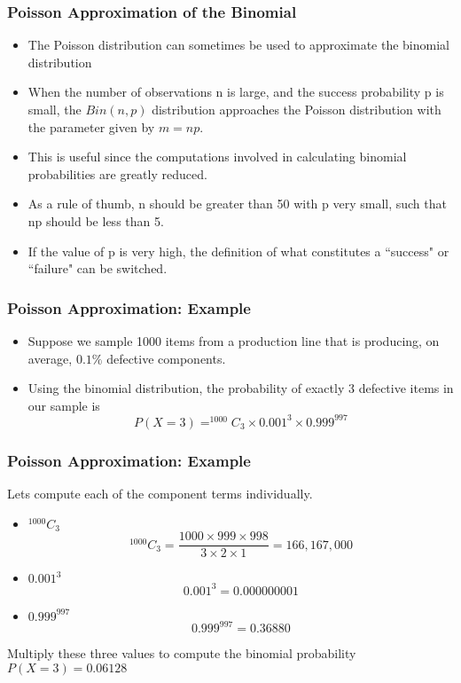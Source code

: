 

\begin{frame}
	\frametitle{Poisson Approximation of the Binomial}
	
	\begin{itemize}
		\item The Poisson distribution can sometimes be used to approximate the
		binomial distribution
		\item When the number of observations n is large, and the success probability
		p is small, the $Bin(n,p)$ distribution approaches the Poisson distribution
		with the parameter given by $m = np$.
		\item This is useful since the computations involved in calculating binomial
		probabilities are greatly reduced.
		\item As a rule of thumb, n should be greater than 50 with p very small, such
		that np should be less than 5.
		\item If the value of p is very high, the definition of what constitutes a
		``success" or ``failure" can be switched.
	\end{itemize}
\end{frame}

\begin{frame}
	\frametitle{Poisson Approximation: Example}
	
	\begin{itemize}
		\item Suppose we sample 1000 items from a production line that is producing, on
		average, $0.1\%$ defective components.
		\item Using the binomial distribution, the probability of exactly 3 defective items in
		our sample is
		\[P(X = 3) = ^{1000}C_{3} \times 0.001^{3} \times 0.999^{997}\]
	\end{itemize}
\end{frame}

\begin{frame}
	\frametitle{Poisson Approximation: Example}
	Lets compute each of the component terms individually.
	
	\begin{itemize}
		\item $^{1000}C_{3}$
		\[^{1000}C_{3} = \frac{1000 \times 999 \times 998}{3 \times 2 \times 1} = 166,167,000\]
		\item $0.001^3$
		\[0.001^3 = 0.000000001\]
		\item $0.999^{997}$
		\[0.999^{997} = 0.36880\]
	\end{itemize}
	
	
	Multiply these three values to compute the binomial probability
	$P(X = 3) = 0.06128$
\end{frame}

